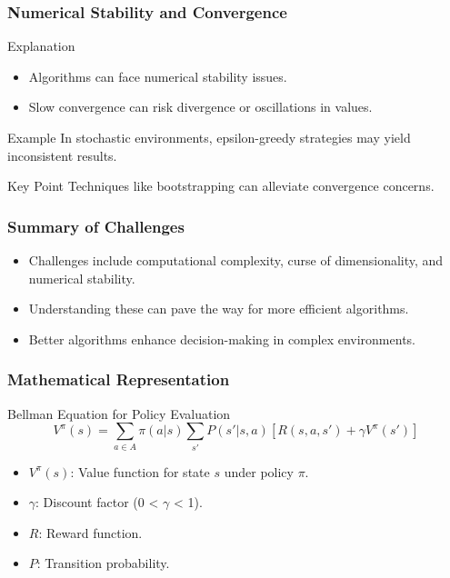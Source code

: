 \documentclass[aspectratio=169]{beamer}
\begin{document}
\begin{frame}[fragile]
    \frametitle{Numerical Stability and Convergence}
    \begin{block}{Explanation}
        \begin{itemize}
            \item Algorithms can face numerical stability issues.
            \item Slow convergence can risk divergence or oscillations in values.
        \end{itemize}
    \end{block}
    
    \begin{block}{Example}
        In stochastic environments, epsilon-greedy strategies may yield inconsistent results.
    \end{block}

    \begin{block}{Key Point}
        Techniques like bootstrapping can alleviate convergence concerns.
    \end{block}
\end{frame}

\begin{frame}[fragile]
    \frametitle{Summary of Challenges}
    \begin{itemize}
        \item Challenges include computational complexity, curse of dimensionality, and numerical stability.
        \item Understanding these can pave the way for more efficient algorithms.
        \item Better algorithms enhance decision-making in complex environments.
    \end{itemize}
\end{frame}

\begin{frame}[fragile]
    \frametitle{Mathematical Representation}
    \begin{block}{Bellman Equation for Policy Evaluation}
        \begin{equation}
        V^\pi(s) = \sum_{a \in A} \pi(a|s) \sum_{s'} P(s'|s, a) [ R(s, a, s') + \gamma V^\pi(s') ]
        \end{equation}
    \end{block}
    \begin{itemize}
        \item $V^\pi(s)$: Value function for state $s$ under policy $\pi$.
        \item $\gamma$: Discount factor (0 < $\gamma$ < 1).
        \item $R$: Reward function.
        \item $P$: Transition probability.
    \end{itemize}
\end{frame}
\end{document}
